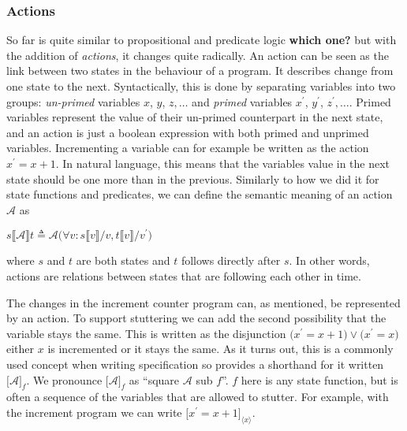 \documentclass[english, biblatex, digitaloutput]{kththesis}
\begin{document}
\subsubsection{Actions}

So far  is quite similar to propositional and predicate logic \textbf{which one?} but with the addition of \textit{actions}, it changes quite radically. An action can be seen as the link between two states in the behaviour of a program. It describes change from one state to the next. Syntactically, this is done by separating variables into two groups: \textit{un-primed} variables $x$, $y$, $z, \dotsc$ and \textit{primed} variables $x^\prime$, $y^\prime$, $z^\prime, \dotsc$. Primed variables represent the value of their un-primed counterpart in the next state, and an action is just a boolean expression with both primed and unprimed variables. Incrementing a variable can for example be written as the action $x^\prime = x + 1$. In natural language, this means that the variables value in the next state should be one more than in the previous. Similarly to how we did it for state functions and predicates, we can define the semantic meaning of an action $\mathcal{A}$ as

\begin{math}
	s \llbracket \mathcal{A} \rrbracket t \triangleq \mathcal{A}\lparen \forall v : s\llbracket v \rrbracket / v, t\llbracket v \rrbracket / v^\prime \rparen
\end{math}

where $s$ and $t$ are both states and $t$ follows directly after $s$. In other words, actions are relations between states that are following each other in time.

The changes in the increment counter program can, as mentioned, be represented by an action. To support stuttering we can add the second possibility that the variable stays the same. This is written as the disjunction $\lparen x^\prime = x + 1 \rparen \lor \lparen x^\prime = x \rparen$ \ie either $x$ is incremented or it stays the same. As it turns out, this is a commonly used concept when writing specification so  provides a shorthand for it written $\lbrack \mathcal{A} \rbrack_f$. We pronounce $\lbrack \mathcal{A} \rbrack_f$ as ``square $\mathcal{A}$ sub $f$''. $f$ here is any state function, but is often a sequence of the variables that are allowed to stutter. For example, with the increment program we can write $\lbrack x^\prime = x + 1 \rbrack_{\langle x \rangle}$.
\end{document}
